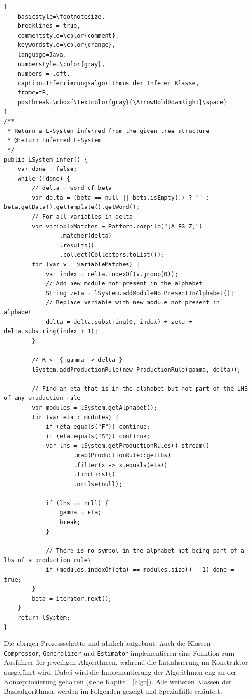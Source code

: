 \begin{lstlisting}[
    basicstyle=\footnotesize,
    breaklines = true,
    commentstyle=\color{comment},
    keywordstyle=\color{orange},
    language=Java,
    numberstyle=\color{gray},
    numbers = left,
    caption=Inferrierungsalgorithmus der Inferer Klasse,
    frame=tB,
    postbreak=\mbox{\textcolor{gray}{\ArrowBoldDownRight}\space}
]
/**
 * Return a L-System inferred from the given tree structure
 * @return Inferred L-System
 */
public LSystem infer() {
    var done = false;
    while (!done) {
        // delta = word of beta
        var delta = (beta == null || beta.isEmpty()) ? "" : beta.getData().getTemplate().getWord();
        // For all variables in delta
        var variableMatches = Pattern.compile("[A-EG-Z]")
                .matcher(delta)
                .results()
                .collect(Collectors.toList());
        for (var v : variableMatches) {
            var index = delta.indexOf(v.group(0));
            // Add new module not present in the alphabet
            String zeta = lSystem.addModuleNotPresentInAlphabet();
            // Replace variable with new module not present in alphabet
            delta = delta.substring(0, index) + zeta + delta.substring(index + 1);
        }

        // R <- { gamma -> delta }
        lSystem.addProductionRule(new ProductionRule(gamma, delta));

        // Find an eta that is in the alphabet but not part of the LHS of any production rule
        var modules = lSystem.getAlphabet();
        for (var eta : modules) {
            if (eta.equals("F")) continue;
            if (eta.equals("S")) continue;
            var lhs = lSystem.getProductionRules().stream()
                    .map(ProductionRule::getLhs)
                    .filter(x -> x.equals(eta))
                    .findFirst()
                    .orElse(null);

            if (lhs == null) {
                gamma = eta;
                break;
            }

            // There is no symbol in the alphabet not being part of a lhs of a production rule?
            if (modules.indexOf(eta) == modules.size() - 1) done = true;
        }
        beta = iterator.next();
    }
    return lSystem;
}
\end{lstlisting}

Die übrigen Prozessschritte sind ähnlich aufgebaut.
Auch die Klassen \texttt{Compressor}, \texttt{Generalizer} und \texttt{Estimator} implementieren eine Funktion zum Ausführer
der jeweiligen Algorithmen, während die Initialisierung im Konstruktor ausgeführt wird.
Dabei wird die Implementierung der Algorithmen eng an der Konzeptionierung gehalten (siehe Kapitel ~\ref{algo}).
Alle weiteren Klassen der Basisalgorithmen werden im Folgenden gezeigt und Spezialfälle erläutert.

